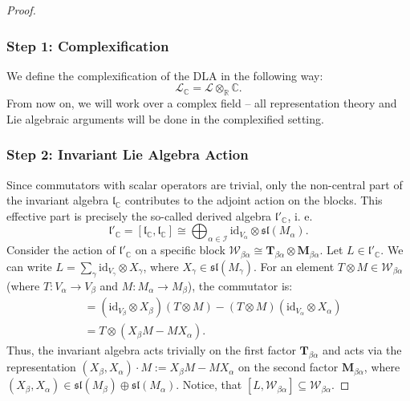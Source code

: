 \documentclass[11pt,letterpaper]{article}
\newcounter{alg}
\theoremstyle{plain}
\theoremstyle{plain}
\theoremstyle{plain}
\theoremstyle{plain}
\theoremstyle{plain}
\theoremstyle{plain}
\newcommand{\C}{\mathbb{C}}
\newcommand{\id}{\mathrm{id}}
\theoremstyle{plain}
\theoremstyle{definition}
\theoremstyle{plain}
\begin{document}
\begin{proof}

\subsubsection*{Step 1: Complexification}

We define the complexification of the DLA in the following way:
\begin{equation}\label{eq:complexified_DLA_with_breakers}
    \mathcal{L}_{\mathbb{C}}=\mathcal{L} \otimes_{\mathbb{R}} \mathbb{C}.
\end{equation}
From now on, we will work over a complex field -- all representation theory and Lie algebraic arguments will be done in the complexified setting.

\subsubsection*{Step 2: Invariant Lie Algebra Action}

Since commutators with scalar operators are trivial, only the non-central part of the invariant algebra $\mathfrak{l}_\C$ contributes to the adjoint action on the blocks. 
This effective part is precisely the so-called derived algebra 
$\mathfrak{l}'_\C$, i. e.
\[
    \mathfrak{l}'_\C = [\mathfrak{l}_\C, \mathfrak{l}_\C] \cong \bigoplus_{\alpha \in \mathcal{I}} \mathrm{id}_{V_\alpha} \otimes \mathfrak{sl}\left(M_\alpha\right).
\]
Consider the action of $\mathfrak{l}'_\C$ on a specific block $\mathcal{W}_{\beta\alpha} \cong \mathbf{T}_{\beta\alpha} \otimes \mathbf{M}_{\beta\alpha}$.
Let $L \in \mathfrak{l}'_\C$. We can write $L = \sum_\gamma \id_{V_\gamma} \otimes X_\gamma$, where $X_\gamma \in \mathfrak{sl}(M_\gamma)$.
For an element $T \otimes M \in \mathcal{W}_{\beta\alpha}$ (where $T: V_\alpha \to V_\beta$ and $M: M_\alpha \rightarrow M_\beta$), the commutator is:
\begin{align*}
    [L, T \otimes M] &= (\id_{V_\beta} \otimes X_\beta)(T \otimes M) - (T \otimes M)(\id_{V_\alpha} \otimes X_\alpha) \nonumber \\
    &= T \otimes (X_\beta M - M X_\alpha).
\end{align*}
Thus, the invariant algebra acts trivially on the first factor $\mathbf{T}_{\beta\alpha}$ and acts via the representation $(X_\beta, X_\alpha) \cdot M := X_\beta M - M X_\alpha$
on the second factor $\mathbf{M}_{\beta\alpha}$, where
$(X_\beta, X_\alpha) \in \mathfrak{sl}\left(M_\beta\right) \oplus \mathfrak{sl}\left(M_\alpha\right)$.
Notice, that $\left[L, \mathcal{W}_{\beta \alpha}\right] \subseteq \mathcal{W}_{\beta \alpha}$.


\end{proof}
\end{document}
